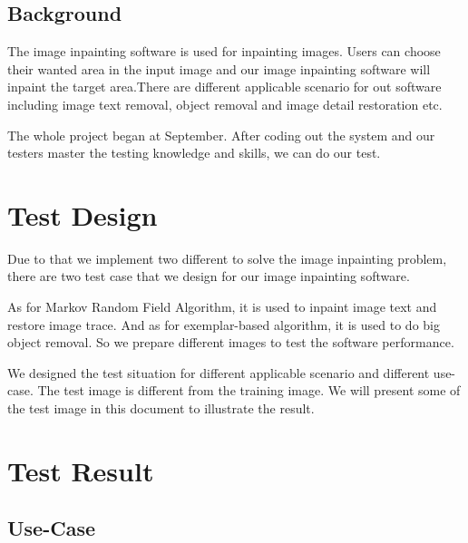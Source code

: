 \documentclass[12pt]{article}
\begin{document}
\subsection{Background}
\qquad The image inpainting software is used for inpainting images. Users can choose their wanted area in the input image and our image inpainting software will inpaint the target area.There are different applicable scenario for out software including image text removal, object removal and image detail restoration etc. 

The whole project began at September. After coding out the system and our testers master the testing knowledge and skills, we can do our test. 

\section{Test Design}
\qquad Due to that we implement two different to solve the image inpainting problem, there are two test case that we design for our image inpainting software.

As for Markov Random Field Algorithm, it is used to inpaint image text and restore image trace. And as for exemplar-based algorithm, it is used to do big object removal. So we prepare different images to test the software performance. 

We designed the test situation for different applicable scenario and different use-case. The test image is different from the training image. We will present some of the test image in this document to illustrate the result.

\section{Test Result}
\subsection{Use-Case}
\end{document}
